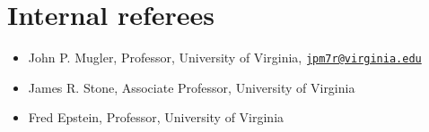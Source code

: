 \documentclass[12pt,]{article}
\providecommand{\tightlist}{%
  \setlength{\itemsep}{0pt}\setlength{\parskip}{0pt}}
\begin{document}
\section{Internal referees}\label{internal-referees}

\begin{itemize}
\tightlist
\item
  John P. Mugler, Professor, University of Virginia,
  \href{mailto:jpm7r@virginia.edu}{\nolinkurl{jpm7r@virginia.edu}}
\item
  James R. Stone, Associate Professor, University of Virginia
\item
  Fred Epstein, Professor, University of Virginia
\end{itemize}
\end{document}
